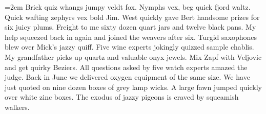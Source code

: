 \texttoks={\emergencystretch2em Brick quiz whangs jumpy veldt fox.
Nymphs vex, beg quick fjord waltz.
Quick wafting zephyrs vex bold Jim.
West quickly gave Bert handsome prizes for six juicy plums.
Freight to me sixty dozen quart jars and twelve black pans.
My help squeezed back in again and joined the weavers after six.
Turgid saxophones blew over Mick's jazzy quiff.
Five wine experts jokingly quizzed sample chablis.
My grandfather picks up quartz and valuable onyx jewels.
Mix Zapf with Veljovic and get quirky Beziers.
All questions asked by five watch experts amazed the judge.
Back in June we delivered oxygen equipment of the same size.
We have just quoted on nine dozen boxes of grey lamp wicks.
A large fawn jumped quickly over white zinc boxes.
The exodus of jazzy pigeons is craved by squeamish walkers.}

\def\freqabc{zjqx%
       kkvv%
       bbbbppppyyyywwwwgggg%
       mmmmmmffffffccccccuuuuuu%
       lllllllldddddddd%
       hhhhhhhhhhhhrrrrrrrrrrrrssssssssssss%
       ooooooooooooooiiiiiiiiiiiiiinnnnnnnnnnnnnn%
       aaaaaaaaaaaaaaaatttttttttttttttttt%
       eeeeeeeeeeeeeeeeeeeeeeee}%

\def\textbox#1#2#3{#1%
\setbox0=\vtop{%
\hbadness10000\hsize\sampletextwd\the\texttoks}%
\setbox1=\vsplit0 to #2\baselineskip
\vtop{\hsize\sampletextwd\centerline{\strut#1[#3]}\smallskip\unvbox1\relax%
1\hfill2\hfill3\hfill4\hfill5\hfill6\hfill7\hfill8\hfill9\hfill0\hfill\&\null\par%
}}

\def\setupmargnote{%
\tinytinytype \setleading \baselineskip=\leading \vskip\baselineskip}

\def\lineoftwo#1#2#3#4#5#6{%
\begingroup
\font\typeone=#3 at #1%
\typeone\setleading \calcxaratio{\typeone}
 \baselineskip=\leading
 \mainleading=\leading
\font\typetwo=#5 at #1%
\line{%
\llap{\vtop{\setupmargnote%
   \halign{\hfill##\cr#1\cr
   \prettypt{\the\mainleading}\cr
   \typefact{#3}\cr
   0.\the\xascrnum\cr}}\enskip}\hss%
\textbox{\typeone}{#2}{#4}%
\hskip\gutter
\typetwo \setleading \calcxaratio{\typetwo}
\textbox{\typetwo}{#2}{#6}%
\hss
\rlap{\enskip\vtop{\setupmargnote%
			\halign{##\hfil\cr#1\cr
   \prettypt{\the\mainleading}\cr
   \typefact{#5}\cr
   0.\the\xascrnum\cr}}}%
}\endgroup}

